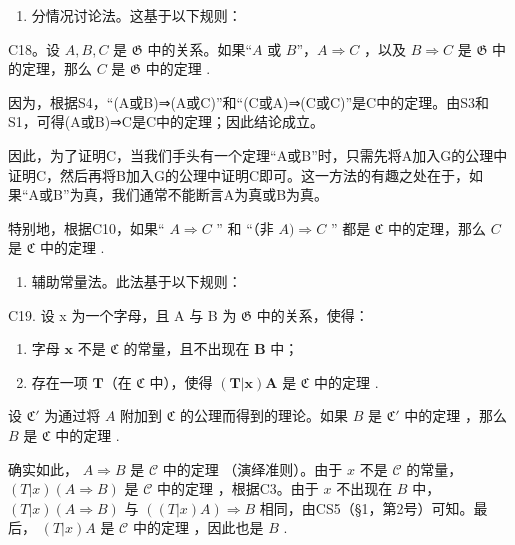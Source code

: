 \begin{enumerate}
\def\labelenumi{\Roman{enumi}.}
\setcounter{enumi}{2}
\tightlist
\item
  分情况讨论法。这基于以下规则：
\end{enumerate}

C18。设 \(A, B, C\) 是 \(\mathfrak{G}\) 中的关系。如果“\(A\) 或 \(B\)”，\(A \Longrightarrow C\) ，以及 \(B \Longrightarrow C\) 是 \(\mathfrak{G}\) 中的定理，那么 \(C\) 是 \(\mathfrak{G}\) 中的定理 .

因为，根据S4，“(A或B)⇒(A或C)”和“(C或A)⇒(C或C)”是C中的定理。由S3和S1，可得(A或B)⇒C是C中的定理；因此结论成立。

因此，为了证明C，当我们手头有一个定理“A或B”时，只需先将A加入G的公理中证明C，然后再将B加入G的公理中证明C即可。这一方法的有趣之处在于，如果“A或B”为真，我们通常不能断言A为真或B为真。

特别地，根据C10，如果`` \(A \Rightarrow C\) '' 和 ``（非 \(A) \Rightarrow C\) '' 都是 \(\mathfrak{C}\) 中的定理，那么 \(C\) 是 \(\mathfrak{C}\) 中的定理 .

\begin{enumerate}
\def\labelenumi{\Roman{enumi}.}
\setcounter{enumi}{3}
\tightlist
\item
  辅助常量法。此法基于以下规则：
\end{enumerate}

C19. 设 x 为一个字母，且 A 与 B 为 \(\mathfrak{G}\) 中的关系，使得：

\begin{enumerate}
\def\labelenumi{(\arabic{enumi})}
\item
  字母 \(\pmb{x}\) 不是 \(\mathfrak{C}\) 的常量，且不出现在 \(\pmb{B}\) 中；
\item
  存在一项 \(\pmb{T}\)（在 \(\mathfrak{C}\) 中），使得 \((\pmb{T}|\pmb{x})\pmb{A}\) 是 \(\mathfrak{C}\) 中的定理 .
\end{enumerate}

设 \(\mathfrak{C}'\) 为通过将 \(A\) 附加到 \(\mathfrak{C}\) 的公理而得到的理论。如果 \(B\) 是 \(\mathfrak{C}'\) 中的定理 ，那么 \(B\) 是 \(\mathfrak{C}\) 中的定理 .

确实如此， \(A \Longrightarrow B\) 是 \(\mathcal{C}\) 中的定理 （演绎准则）。由于 \(x\) 不是 \(\mathcal{C}\) 的常量， \((T|x)(A \Longrightarrow B)\) 是 \(\mathcal{C}\) 中的定理 ，根据C3。由于 \(x\) 不出现在 \(B\) 中， \((T|x)(A \Longrightarrow B)\) 与 \(((T|x)A) \Longrightarrow B\) 相同，由CS5（§1，第2号）可知。最后， \((T|x)A\) 是 \(\mathcal{C}\) 中的定理 ，因此也是 \(B\) .

